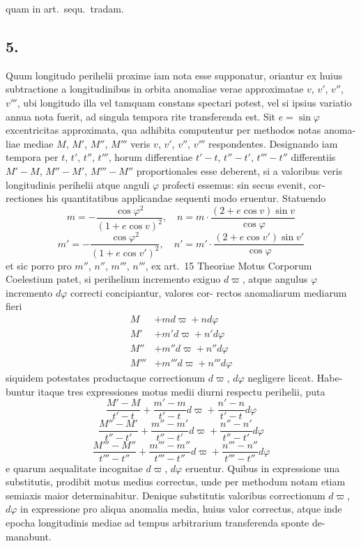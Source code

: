 \documentclass[12pt,a4paper]{article}
\begin{document}
quam in art.\ sequ.\ tradam.

\subsection*{5.}

Quum longitudo perihelii proxime iam nota esse supponatur, oriantur
ex huius subtractione a longitudinibus in orbita anomaliae verae approximatae
$v$, $v'$, $v''$, $v'''$, ubi longitudo illa vel tamquam constans spectari potest, vel si ipsius
variatio annua nota fuerit, ad singula tempora rite transferenda est. Sit $e = \sin\varphi$
excentricitas approximata, qua adhibita computentur per methodos notas anoma-
liae mediae $M$, $M'$, $M''$, $M'''$ veris $v$, $v'$, $v''$, $v'''$ respondentes. Designando iam
tempora per $t$, $t'$, $t''$, $t'''$, horum differentiae $t' - t$, $t'' - t'$, $t''' - t''$ differentiis
$M' - M$, $M'' - M'$, $M''' - M''$ proportionales esse deberent, si a valoribus veris
longitudinis perihelii atque anguli $\varphi$ profecti essemus: sin secus evenit, cor-
rectiones his quantitatibus applicandae sequenti modo eruentur. Statuendo
\[
m = -\frac{\cos\varphi^2}{(1+e\cos v)^2}, \quad
n = m \cdot \frac{(2+e\cos v)\sin v}{\cos\varphi}
\]
\[
m' = -\frac{\cos\varphi^2}{(1+e\cos v')^2}, \quad
n' = m' \cdot \frac{(2+e\cos v')\sin v'}{\cos\varphi}
\]
et sic porro pro $m''$, $n''$, $m'''$, $n'''$, ex art.~15 Theoriae Motus Corporum Coelestium patet, si perihelium incremento
exiguo $d\varpi$, atque angulus $\varphi$ incremento $d\varphi$ correcti concipiantur, valores cor-
rectos anomaliarum mediarum fieri
\begin{align*}
M &+ md\varpi + nd\varphi \\
M' &+ m'd\varpi + n'd\varphi \\
M'' &+ m''d\varpi + n''d\varphi \\
M''' &+ m'''d\varpi + n'''d\varphi
\end{align*}
siquidem potestates productaque correctionum $d\varpi$, $d\varphi$ negligere liceat. Habe-
buntur itaque tres expressiones motus medii diurni respectu perihelii, puta
\[
\frac{M' - M}{t' - t} + \frac{m' - m}{t' - t}d\varpi + \frac{n' - n}{t' - t}d\varphi
\]
\[
\frac{M'' - M'}{t'' - t'} + \frac{m'' - m'}{t'' - t'}d\varpi + \frac{n'' - n'}{t'' - t'}d\varphi
\]
\[
\frac{M''' - M''}{t''' - t''} + \frac{m''' - m''}{t''' - t''}d\varpi + \frac{n''' - n''}{t''' - t''}d\varphi
\]
e quarum aequalitate incognitae $d\varpi$, $d\varphi$ eruentur. Quibus in expressione una
substitutis, prodibit motus medius correctus, unde per methodum notam etiam
semiaxis maior determinabitur. Denique substitutis valoribus correctionum
$d\varpi$, $d\varphi$ in expressione pro aliqua anomalia media, huius valor correctus, atque
inde epocha longitudinis mediae ad tempus arbitrarium transferenda sponte de-
manabunt.
\end{document}
